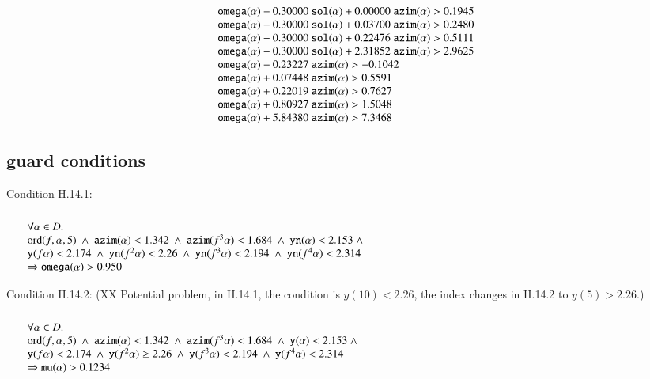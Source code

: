 $$\begin{array}{lll}
   \optt{omega}(\alpha) - 0.30000\ \optt{sol}(\alpha) + 0.00000\ \optt{azim}(\alpha) > 0.1945\\
   \optt{omega}(\alpha) - 0.30000\ \optt{sol}(\alpha) + 0.03700\ \optt{azim}(\alpha) > 0.2480\\
   \optt{omega}(\alpha) - 0.30000\ \optt{sol}(\alpha) + 0.22476\ \optt{azim}(\alpha) > 0.5111\\
   \optt{omega}(\alpha) - 0.30000\ \optt{sol}(\alpha) + 2.31852\ \optt{azim}(\alpha) > 2.9625\\
   \optt{omega}(\alpha) - 0.23227\ \optt{azim}(\alpha) > -0.1042\\
   \optt{omega}(\alpha) + 0.07448\ \optt{azim}(\alpha) > 0.5591\\
   \optt{omega}(\alpha) + 0.22019\ \optt{azim}(\alpha) > 0.7627\\
   \optt{omega}(\alpha) + 0.80927\ \optt{azim}(\alpha) > 1.5048\\
   \optt{omega}(\alpha) + 5.84380\ \optt{azim}(\alpha) > 7.3468\\
\end{array}
$$




\subsection{guard conditions}

\noindent
Condition H.14.1:  %
$$
\begin{array}{lll}
\leftalign\\
\forall \alpha\in D.\\
  \op{ord}(f,\alpha,5) \sland 
  \optt{azim}(\alpha) < 1.342 \sland
  \optt{azim}(f^3\alpha) < 1.684 \sland
  \optt{yn}(\alpha) < 2.153 \sland \\
   \optt{y}(f\alpha) < 2.174 \sland
  \optt{yn}(f^2\alpha) < 2.26 \sland
  \optt{yn}(f^3 \alpha) < 2.194 \sland
  \optt{yn}(f^4 \alpha) < 2.314  \\
  \Rightarrow
  \optt{omega}(\alpha) > 0.950
\end{array}
$$

\noindent
Condition H.14.2:  (XX Potential problem, in H.14.1, the
condition is $y(10)< 2.26$, the index changes in H.14.2
to $y(5) > 2.26$.)
$$
\begin{array}{lll}
\leftalign\\
\forall \alpha\in D.\\
  \op{ord}(f,\alpha,5) \sland 
  \optt{azim}(\alpha) < 1.342 \sland
  \optt{azim}(f^3\alpha) < 1.684 \sland
  \optt{y}(\alpha) < 2.153 \sland \\
   \optt{y}(f\alpha) < 2.174 \sland
  \optt{y}(f^2\alpha) \ge 2.26 \sland
  \optt{y}(f^3 \alpha) < 2.194 \sland
  \optt{y}(f^4 \alpha) < 2.314  \\
   \Rightarrow
  \optt{mu}(\alpha) > 0.1234
\end{array}
$$
